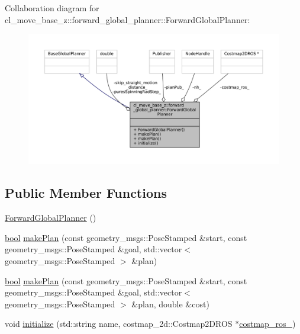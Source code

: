 Collaboration diagram for cl\+\_\+move\+\_\+base\+\_\+z\+:\+:forward\+\_\+global\+\_\+planner\+:\+:Forward\+Global\+Planner\+:
\nopagebreak
\begin{figure}[H]
\begin{center}
\leavevmode
\includegraphics[width=350pt]{classcl__move__base__z_1_1forward__global__planner_1_1ForwardGlobalPlanner__coll__graph}
\end{center}
\end{figure}
\subsection*{Public Member Functions}
\begin{DoxyCompactItemize}
\item 
\hyperlink{classcl__move__base__z_1_1forward__global__planner_1_1ForwardGlobalPlanner_a27715025f147a38b1422dd55ce2a9e0b}{Forward\+Global\+Planner} ()
\item 
\hyperlink{classbool}{bool} \hyperlink{classcl__move__base__z_1_1forward__global__planner_1_1ForwardGlobalPlanner_a9d7c48877a390ca3cc580a7ffa50d316}{make\+Plan} (const geometry\+\_\+msgs\+::\+Pose\+Stamped \&start, const geometry\+\_\+msgs\+::\+Pose\+Stamped \&goal, std\+::vector$<$ geometry\+\_\+msgs\+::\+Pose\+Stamped $>$ \&plan)
\item 
\hyperlink{classbool}{bool} \hyperlink{classcl__move__base__z_1_1forward__global__planner_1_1ForwardGlobalPlanner_ab01769603169105e92d9b6e479147bce}{make\+Plan} (const geometry\+\_\+msgs\+::\+Pose\+Stamped \&start, const geometry\+\_\+msgs\+::\+Pose\+Stamped \&goal, std\+::vector$<$ geometry\+\_\+msgs\+::\+Pose\+Stamped $>$ \&plan, double \&cost)
\item 
void \hyperlink{classcl__move__base__z_1_1forward__global__planner_1_1ForwardGlobalPlanner_a3db25ea418729d257876394b5c0987dc}{initialize} (std\+::string name, costmap\+\_\+2d\+::\+Costmap2\+D\+R\+OS $\ast$\hyperlink{classcl__move__base__z_1_1forward__global__planner_1_1ForwardGlobalPlanner_a711d4a0d92a216eb8cab3b42f18eb795}{costmap\+\_\+ros\+\_\+})
\end{DoxyCompactItemize}
